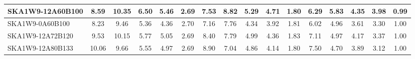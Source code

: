 \begin{table}[H]
{{\begin{tabular}{|lccccc||ccccc||ccccc|}
SKA1W9-12A60B100 & 8.59 \cellcolor{blue!28.97} & 10.35 \cellcolor{red!60.00} & 6.50 \cellcolor{green!45.50} & 5.46 \cellcolor{orange!58.17} & 2.69 \cellcolor{purple!21.82} & 7.53 \cellcolor{blue!29.39} & 8.82 \cellcolor{red!56.85} & 5.29 \cellcolor{green!52.70} & 4.71 \cellcolor{orange!52.93} & 1.80 \cellcolor{purple!28.50} & 6.29 \cellcolor{blue!32.97} & 5.83 \cellcolor{red!45.34} & 4.35 \cellcolor{green!50.04} & 3.98 \cellcolor{orange!53.41} & 0.99 \cellcolor{purple!18.00}\\ \hline 
SKA1W9-0A60B100 & 8.23 \cellcolor{blue!21.38} & 9.46 \cellcolor{red!49.70} & 5.36 \cellcolor{green!21.20} & 4.36 \cellcolor{orange!18.00} & 2.70 \cellcolor{purple!25.64} & 7.16 \cellcolor{blue!21.13} & 7.76 \cellcolor{red!44.02} & 4.34 \cellcolor{green!18.00} & 3.92 \cellcolor{orange!18.00} & 1.81 \cellcolor{purple!32.00} & 6.02 \cellcolor{blue!26.94} & 4.96 \cellcolor{red!29.80} & 3.61 \cellcolor{green!18.00} & 3.30 \cellcolor{orange!25.41} & 1.00 \cellcolor{purple!25.00}\\ \hline 
SKA1W9-12A72B120 & 9.53 \cellcolor{blue!48.81} & 10.15 \cellcolor{red!57.69} & 5.77 \cellcolor{green!29.94} & 5.05 \cellcolor{orange!43.20} & 2.69 \cellcolor{purple!21.82} & 8.40 \cellcolor{blue!48.83} & 7.79 \cellcolor{red!44.39} & 4.99 \cellcolor{green!41.74} & 4.36 \cellcolor{orange!37.45} & 1.83 \cellcolor{purple!39.00} & 7.11 \cellcolor{blue!51.29} & 4.97 \cellcolor{red!29.97} & 4.17 \cellcolor{green!42.25} & 3.37 \cellcolor{orange!28.29} & 1.00 \cellcolor{purple!25.00}\\ \hline 
SKA1W9-12A80B133 & 10.06 \cellcolor{blue!60.00} & 9.66 \cellcolor{red!52.02} & 5.55 \cellcolor{green!25.25} & 4.97 \cellcolor{orange!40.28} & 2.69 \cellcolor{purple!21.82} & 8.90 \cellcolor{blue!60.00} & 7.04 \cellcolor{red!35.31} & 4.86 \cellcolor{green!36.99} & 4.14 \cellcolor{orange!27.73} & 1.80 \cellcolor{purple!28.50} & 7.50 \cellcolor{blue!60.00} & 4.70 \cellcolor{red!25.15} & 3.89 \cellcolor{green!30.12} & 3.12 \cellcolor{orange!18.00} & 1.00 \cellcolor{purple!25.00}\\ \hline 
\end{tabular}}
\vspace{-0.300000cm}
\hspace{1cm} 
}
\end{table}

